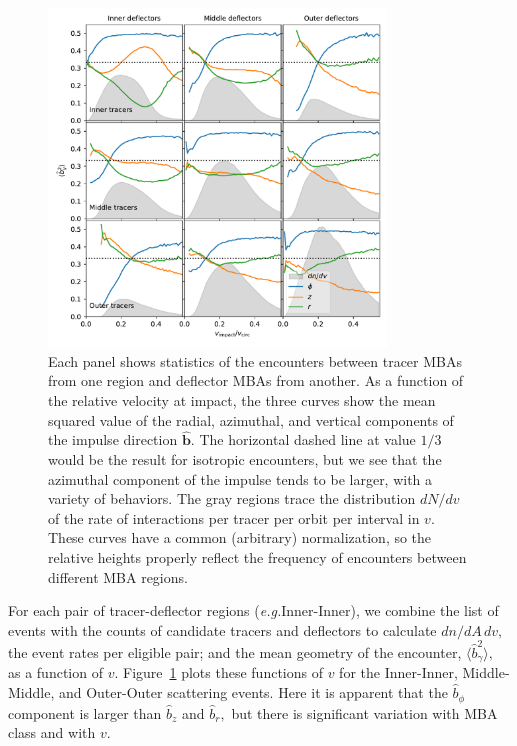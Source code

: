 \documentclass[linenumbers, onecolumn]{aastex631}
\newcommand{\eg}{\textit{e.g.\/}}
\newcommand{\bhat}{\mathbf{\hat b}}
\begin{document}
\begin{figure}
  \centering
  \includegraphics[width=0.8\textwidth]{isq.pdf}
  \caption{Each panel shows statistics of the encounters between
    tracer MBAs from one region and deflector MBAs from another.  As a
    function of the relative velocity at impact, the three curves show
    the mean squared value of the radial, azimuthal, and vertical
    components of the impulse direction $\bhat.$  The horizontal
    dashed line at value $1/3$ would be the result for isotropic
    encounters, but we see that the azimuthal component of the impulse
    tends to be larger, with a variety of behaviors.  The gray regions
    trace the distribution $dN/dv$ of the rate of interactions per
    tracer per orbit per interval in $v.$  These curves have a common
    (arbitrary) normalization, so the relative heights properly
    reflect the frequency of encounters between different MBA
    regions.}
  \label{fig:rtz}
\end{figure}

For each pair of tracer-deflector regions (\eg Inner-Inner), we combine the list of
events with the counts of candidate tracers and deflectors to
calculate $dn/dA\,dv,$ the event rates per eligible pair; and the mean
geometry of the encounter, $\langle \hat b^2_\gamma \rangle,$ as a
function of $v$.  Figure~\ref{fig:rtz} plots these functions of $v$
for the Inner-Inner, Middle-Middle, and Outer-Outer scattering
events.  Here it is apparent that the $\hat b_\phi$ component is
larger than $\hat b_z$ and $\hat b_r,$ but there is significant
variation with MBA class and with $v$.
\end{document}
